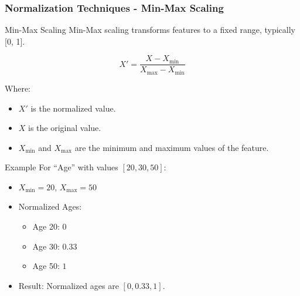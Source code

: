 \documentclass[aspectratio=169]{beamer}
\begin{document}
\begin{frame}[fragile]
    \frametitle{Normalization Techniques - Min-Max Scaling}
    \begin{block}{Min-Max Scaling}
        Min-Max scaling transforms features to a fixed range, typically [0, 1].
        
        \begin{equation}
        X' = \frac{X - X_{\min}}{X_{\max} - X_{\min}}
        \end{equation}

        Where:
        \begin{itemize}
            \item \(X'\) is the normalized value.
            \item \(X\) is the original value.
            \item \(X_{\min}\) and \(X_{\max}\) are the minimum and maximum values of the feature.
        \end{itemize}
    \end{block}

    \begin{block}{Example}
        For “Age” with values \([20, 30, 50]\):
        \begin{itemize}
            \item \(X_{\min} = 20\), \(X_{\max} = 50\)
            \item Normalized Ages:
            \begin{itemize}
                \item Age 20: \(0\)
                \item Age 30: \(0.33\)
                \item Age 50: \(1\)
            \end{itemize}
            \item Result: Normalized ages are \([0, 0.33, 1]\).
        \end{itemize}
    \end{block}
\end{frame}
\end{document}
